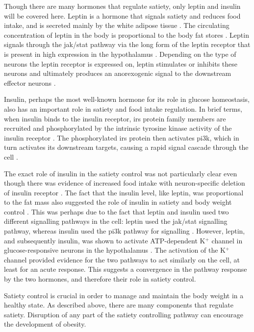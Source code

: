 Though there are many hormones that regulate satiety, only leptin and insulin will be covered here.
Leptin is a hormone that signals satiety and reduces food intake, and is secreted mainly by the white adipose tissue \citep{Moustafa2013,Zhang1994}.
The circulating concentration of leptin in the body is proportional to the body fat stores \citep{Barsh2002, Moustafa2013}.
Leptin signals through the \gls{jak}/\gls{stat} pathway via the long form of the leptin receptor that is present in high expression in the hypothalamus \citep{Ghilardi1996,Lee1996}.
Depending on the type of neurons the leptin receptor is expressed on, leptin stimulates or inhibits these neurons and ultimately produces an anorexogenic signal to the downstream effector neurons \citep{Bell2005}.

Insulin, perhaps the most well-known hormone for its role in glucose homeostasis, also has an important role in satiety and food intake regulation.
In brief terms, when insulin binds to the insulin receptor, \gls{irs} protein family members are recruited and phosphorylated by the  intrinsic tyrosine kinase activity of the insulin receptor \citep{Saltiel2002}.
The phosphorylated \gls{irs} protein then activates \gls{pi3k}, which in turn activates its downstream targets, causing a rapid signal cascade through the cell \citep{Saltiel2002}.

The exact role of insulin in the satiety control was not particularly clear even though there was evidence of increased food intake with neuron-specific deletion of insulin receptor \citep{Barsh2002,Bruning2000}.
The fact that the insulin level, like leptin, was proportional to the fat mass also suggested the role of insulin in satiety and body weight control \citep{Barsh2002, Bruning2000, Woods1979}.
This was perhaps due to the fact that leptin and insulin used two different signalling pathways in the cell: leptin used the \gls{jak}/\gls{stat} signalling pathway, whereas insulin used the \gls{pi3k} pathway for signalling \citep{Ghilardi1996}.
However, leptin, and subsequently insulin, was shown to activate ATP-dep\-endent K$^+$ channel in glucose-responsive neurons in the hypothalamus \citep{Spanswick1997, Spanswick2000}.
The activation of the K$^+$ channel provided evidence for the two pathways to act similarly on the cell, at least for an acute response.
This suggests a convergence in the pathway response by the two hormones, and therefore their role in satiety control.

Satiety control is crucial in order to manage  and maintain the body weight in a healthy state.
As described above, there are many components that regulate satiety.
Disruption of any part of the satiety controlling pathway can encourage the development of obesity.


